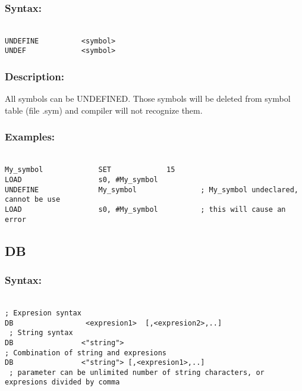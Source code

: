         \subsubsection{Syntax:}
        {
            ~\\
            \usecodefont
        \verb'UNDEFINE          <symbol>'\\
        \verb'UNDEF             <symbol>'
        }
        \subsubsection{Description:}
        All symbols can be UNDEFINED. Those symbols will be deleted from symbol table (file .sym) and compiler will not recognize them.

        \subsubsection{Examples:}
        {
            ~\\
            \usecodefont
            \verb'My_symbol             SET             15'\\
            \verb'LOAD                  s0, #My_symbol'\\
            \verb'UNDEFINE              My_symbol               ; My_symbol undeclared, cannot be use'\\
            \verb'LOAD                  s0, #My_symbol          ; this will cause an error'\\
        }

    \subsection{DB}
        \subsubsection{Syntax:}
        {
            ~\\
            \usecodefont
            \verb '; Expresion syntax'\\
            \verb'DB                 <expresion1>  [,<expresion2>,..]'\\
            \verb' ; String syntax'\\
            \verb'DB                <"string">'\\
            \verb'; Combination of string and expresions'\\
            \verb'DB                <"string"> [,<expresion1>,..]'\\
            \verb' ; parameter can be unlimited number of string characters, or expresions divided by comma'\\
        }
